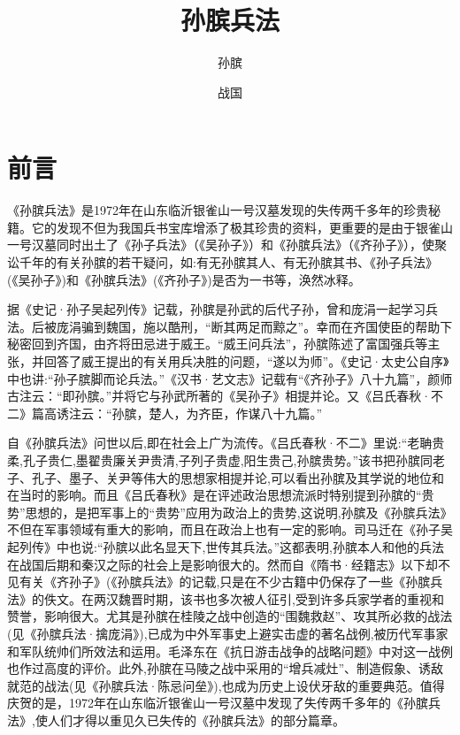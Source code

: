 \documentclass[12pt,UTF8]{ctexbook}
\title{\heiti\zihao{0} 孙膑兵法}
\author{孙膑}
\date{战国}
\begin{document}
	
\maketitle
\tableofcontents

\frontmatter
\chapter{前言}

《孙膑兵法》是1972年在山东临沂银雀山一号汉墓发现的失传两千多年的珍贵秘籍。它的发现不但为我国兵书宝库增添了极其珍贵的资料，更重要的是由于银雀山一号汉墓同时出土了《孙子兵法》（《吴孙子》）和《孙膑兵法》（《齐孙子》），使聚讼千年的有关孙膑的若干疑问，如:有无孙膑其人、有无孙膑其书、《孙子兵法》(《吴孙子》)和《孙膑兵法》(《齐孙子》)是否为一书等，涣然冰释。

据《史记·孙子吴起列传》记载，孙膑是孙武的后代子孙，曾和庞涓一起学习兵法。后被庞涓骗到魏国，施以酷刑，“断其两足而黥之”。幸而在齐国使臣的帮助下秘密回到齐国，由齐将田忌进于威王。“威王问兵法”，孙膑陈述了富国强兵等主张，并回答了威王提出的有关用兵决胜的问题，“遂以为师”。《史记·太史公自序》中也讲:“孙子膑脚而论兵法。”《汉书·艺文志》记载有“《齐孙子》八十九篇”，颜师古注云：“即孙膑。”并将它与孙武所著的《吴孙子》相提并论。又《吕氏春秋·不二》篇高诱注云：“孙膑，楚人，为齐臣，作谋八十九篇。”

自《孙膑兵法》问世以后,即在社会上广为流传。《吕氏春秋·不二》里说:“老聃贵柔,孔子贵仁,墨翟贵廉关尹贵清,子列子贵虚,阳生贵己,孙膑贵势。”该书把孙膑同老子、孔子、墨子、关尹等伟大的思想家相提并论,可以看出孙膑及其学说的地位和在当时的影响。而且《吕氏春秋》是在评述政治思想流派时特别提到孙膑的“贵势”思想的，是把军事上的“贵势”应用为政治上的贵势,这说明,孙膑及《孙膑兵法》不但在军事领域有重大的影响，而且在政治上也有一定的影响。司马迁在《孙子吴起列传》中也说:“孙膑以此名显天下,世传其兵法。”这都表明,孙膑本人和他的兵法在战国后期和秦汉之际的社会上是影响很大的。然而自《隋书·经籍志》以下却不见有关《齐孙子》(《孙膑兵法》的记载,只是在不少古籍中仍保存了一些《孙膑兵法》的佚文。在两汉魏晋时期，该书也多次被人征引,受到许多兵家学者的重视和赞誉，影响很大。尤其是孙膑在桂陵之战中创造的“围魏救赵”、攻其所必救的战法(见《孙膑兵法·擒庞涓》),已成为中外军事史上避实击虚的著名战例,被历代军事家和军队统帅们所效法和运用。毛泽东在《抗日游击战争的战略问题》中对这一战例也作过高度的评价。此外,孙膑在马陵之战中采用的“增兵减灶”、制造假象、诱敌就范的战法(见《孙膑兵法·陈忌问垒》),也成为历史上设伏牙敌的重要典范。值得庆贺的是，1972年在山东临沂银雀山一号汉墓中发现了失传两千多年的《孙膑兵法》,使人们才得以重见久已失传的《孙膑兵法》的部分篇章。
\end{document}
